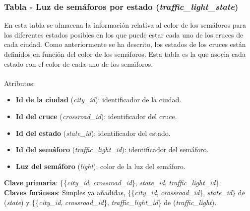 \subsubsection{Tabla - Luz de semáforos por estado (\textit{traffic\_light\_state})}
En esta tabla se almacena la información relativa al color de los semáforos para los diferentes estados posibles en los que puede estar cada uno de los cruces de cada ciudad. Como anteriormente se ha descrito, los estados de los cruces están definidos en función del color de los semáforos. Esta tabla es la que asocia cada estado con el color de cada uno de los semáforos. \\\\
Atributos:
\begin{itemize}
    \item \textbf{Id de la ciudad} (\textit{city\_id}): identificador de la ciudad.
    \item \textbf{Id del cruce} (\textit{crossroad\_id}): identificador del cruce.
    \item \textbf{Id del estado} (\textit{state\_id}): identificador del estado.
    \item \textbf{Id del semáforo} (\textit{traffic\_light\_id}): identificador del semáforo.
    \item \textbf{Luz del semáforo} (\textit{light}): color de la luz del semáforo.
\end{itemize}
\textbf{Clave primaria}: \{\{\textit{city\_id}, \textit{crossroad\_id}\}, \textit{state\_id}, \textit{traffic\_light\_id}\}. \\
\textbf{Claves foráneas}: Simples ya añadidas, \{\{\textit{city\_id}, \textit{crossroad\_id}\}, \textit{state\_id}\} de (\textit{state}) y \{\{\textit{city\_id}, \textit{crossroad\_id}\}, \textit{traffic\_light\_id}\} de (\textit{traffic\_light}).

